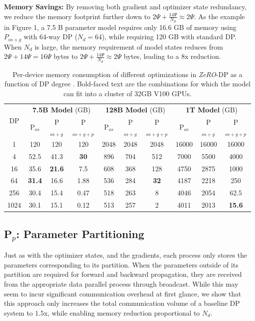\documentclass{article}
\newcommand{\name}{\emph{ZeRO}\xspace}
\begin{document}
\textbf{Memory Savings:} By removing both gradient and optimizer state redundancy, we reduce the memory footprint further down to $ 2 \Psi + \frac{14\Psi}{N_d} \approx 2 \Psi$. 
As the example in Figure 1, a 7.5 B parameter model requires only 16.6 GB of memory using $P_{os+g}$ with 64-way DP ($N_d = 64$), while requiring 120 GB with standard DP.
When $N_d$ is large,  the memory requirement of model states reduces from $2\Psi+14\Psi=16\Psi$ bytes to $ 2 \Psi + \frac{14 \Psi}{N_d} \approx 2 \Psi$ bytes, leading to a 8x reduction.
  \begin{table}
        \centering
        \begin{tabular}{|c||c|c|c||c|c|c||c|c|c|}
        \hline
        \multicolumn{1}{|c}{\multirow{2}{*}{DP}}&\multicolumn{3}{||c}{\textbf{7.5B Model} (GB)} &\multicolumn{3}{||c}{\textbf{128B Model} (GB)} & \multicolumn{3}{||c|}{\textbf {1T Model} (GB)} \\
        \hhline{~---------}
        &P$_{os}$&P$_{os+g}$&P$_{os+g+p}$&P$_{os}$&P$_{os+g}$&P$_{os+g+p}$&P$_{os}$&P$_{os+g}$&P$_{os+g+p}$\\
        \hline
        1&120&120&120&2048&2048&2048&16000&16000&16000\\
        4&52.5&41.3&\textbf{30}&896&704&512&7000&5500&4000\\
        16&35.6&\textbf{21.6}&7.5&608&368&128&4750&2875&1000\\
        64&\textbf{31.4}&16.6&1.88&536&284&\textbf{32}&4187&2218&250\\
        256&30.4&15.4&0.47&518&263&8&4046&2054&62.5\\
        1024&30.1&15.1&0.12&513&257&2&4011&2013&\textbf{15.6}\\
        \hline
        \end{tabular}
     \caption{Per-device memory consumption of different optimizations in \name-DP as a function of DP degree . Bold-faced text are the combinations for which the model can fit into a cluster of 32GB V100 GPUs.}
     \label{tab:memory-consumption}
 \end{table}

\subsection{P$_p$: Parameter Partitioning}\label{sec:pp}
Just as with the optimizer states, and the gradients, each process only stores the parameters corresponding to its partition. When the parameters outside of its partition are required for forward and backward propagation, they are received from the appropriate data parallel process through broadcast. While this may seem to incur significant communication overhead at first glance, we show that this approach only increases the total communication volume of a baseline DP system to $1.5$x, while enabling memory reduction proportional to $N_d$.
\end{document}
